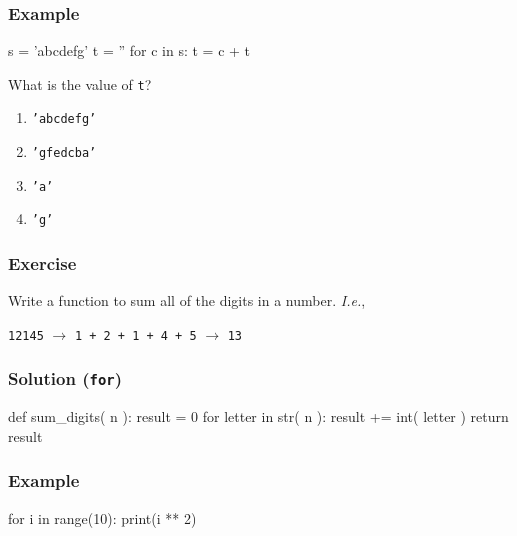 \documentclass[11pt]{beamer}
\begin{document}
\begin{frame}[fragile]
  \frametitle{Example}
  \Enlarge

  \begin{semiverbatim}
s = 'abcdefg'
t = ''
for c in s:
    t = c + t
  \end{semiverbatim}
  What is the value of \texttt{t}?
  \begin{enumerate}[label=\Alph*]
  \item  \texttt{'abcdefg'}
  \item  \texttt{'gfedcba'}
  \item  \texttt{'a'}
  \item  \texttt{'g'}
  \end{enumerate}
\end{frame}

\begin{frame}[fragile]
  \frametitle{Exercise}
  \Enlarge

  Write a function to sum all of the digits in a number.  \emph{I.e.},

  \begin{center}
  \texttt{12145} $\rightarrow$ \texttt{1 + 2 + 1 + 4 + 5} $\rightarrow$ \texttt{13}
  \end{center}
\end{frame}

\begin{frame}[fragile]
  \frametitle{Solution (\texttt{for})}
  \Enlarge

  \begin{semiverbatim}
def sum_digits( n ):
    result = 0
    for letter in str( n ):
        result += int( letter )
    return result
  \end{semiverbatim}
\end{frame}

\begin{frame}[fragile]
  \frametitle{Example}
  \Enlarge

  \begin{semiverbatim}
for i in range(10):
    print(i ** 2)
  \end{semiverbatim}
\end{frame}
\end{document}
